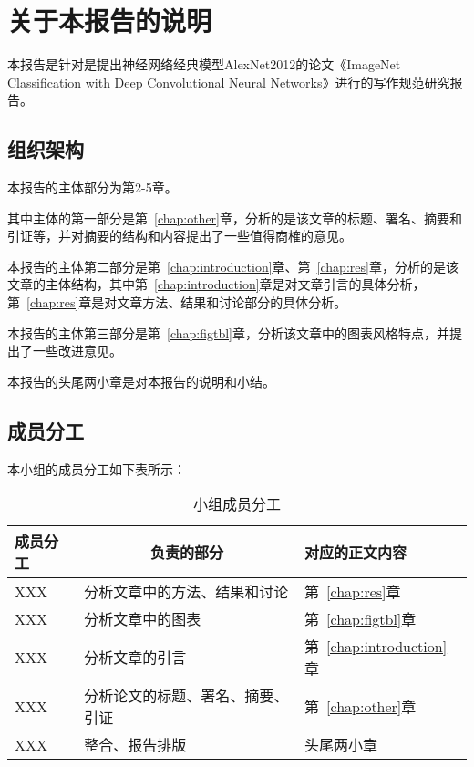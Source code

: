 \chapter{关于本报告的说明}\label{chap:dscpt}

本报告是针对是提出神经网络经典模型AlexNet2012的论文《ImageNet Classiﬁcation with Deep Convolutional Neural Networks》进行的写作规范研究报告。
\section{组织架构}

本报告的主体部分为第2-5章。

其中主体的第一部分是第~\ref{chap:other}章，分析的是该文章的标题、署名、摘要和引证等，并对摘要的结构和内容提出了一些值得商榷的意见。

本报告的主体第二部分是第~\ref{chap:introduction}章、第~\ref{chap:res}章，分析的是该文章的主体结构，其中第~\ref{chap:introduction}章是对文章引言的具体分析，第~\ref{chap:res}章是对文章方法、结果和讨论部分的具体分析。

本报告的主体第三部分是第~\ref{chap:figtbl}章，分析该文章中的图表风格特点，并提出了一些改进意见。

本报告的头尾两小章是对本报告的说明和小结。
\section{成员分工}
本小组的成员分工如下表所示：

\begin{table}[!htbp]
  \centering
  \caption{小组成员分工}
    \begin{tabular}{lll}
    \toprule
    \textbf{成员分工} & \multicolumn{1}{c}{\textbf{负责的部分}} & \multicolumn{1}{l}{\textbf{对应的正文内容}} \\
    \midrule
        XXX & 分析文章中的方法、结果和讨论 & 第~\ref{chap:res}章\\
        XXX & 分析文章中的图表 & 第~\ref{chap:figtbl}章\\
        XXX & 分析文章的引言 & 第~\ref{chap:introduction}章\\
        XXX & 分析论文的标题、署名、摘要、引证 & 第~\ref{chap:other}章\\
        XXX & 整合、报告排版 & 头尾两小章\\
    \midrule
    \end{tabular}%
  \label{tab:division}%
\end{table}%

